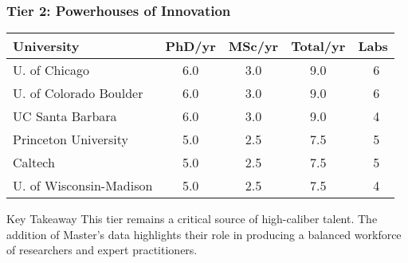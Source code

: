 \documentclass[aspectratio=169]{beamer}
\newcommand{\tabletext}{\normalsize}
\begin{document}
\begin{frame}
    \frametitle{Tier 2: Powerhouses of Innovation}
    \subtitle{Large producers with 7-9 total theses per year}

    \begin{table}
        \centering
        \tabletext
        \begin{tabularx}{\textwidth}{
            l
            S[table-format=1.1]
            S[table-format=1.1]
            S[table-format=1.1]
            S[table-format=2.0, table-space-text-pre=~]
        }
            \toprule
            \textbf{University} & {\textbf{PhD/yr}} & {\textbf{MSc/yr}} & {\textbf{Total/yr}} & {\textbf{Labs}} \\
            \midrule
            U. of Chicago & 6.0 & 3.0 & 9.0 & ~6 \\
            U. of Colorado Boulder & 6.0 & 3.0 & 9.0 & ~6 \\
            UC Santa Barbara & 6.0 & 3.0 & 9.0 & ~4 \\
            Princeton University & 5.0 & 2.5 & 7.5 & ~5 \\
            Caltech & 5.0 & 2.5 & 7.5 & ~5 \\
            U. of Wisconsin-Madison & 5.0 & 2.5 & 7.5 & ~4 \\
            \bottomrule
        \end{tabularx}
    \end{table}
    
    \begin{block}{Key Takeaway}
    This tier remains a critical source of high-caliber talent. The addition of Master's data highlights their role in producing a balanced workforce of researchers and expert practitioners.
    \end{block}
\end{frame}
\end{document}
